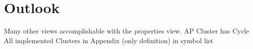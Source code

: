 \documentclass[preview]{standalone}
\begin{document}
\section{Outlook}
Many other views accomplishable with the properties view.
AP Cluster has Cycle
All implemented Clusters in Appendix (only definition)
\intmodn {} \natnums in symbol list
\end{document}
